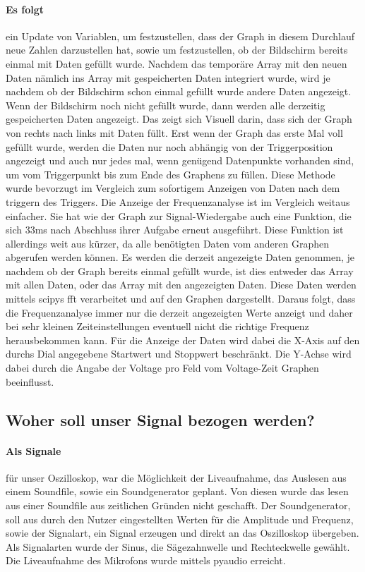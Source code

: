 \documentclass{article}
\begin{document}
\paragraph{Es folgt}
ein Update von Variablen, um festzustellen, dass der Graph in diesem Durchlauf neue Zahlen darzustellen hat, sowie um festzustellen, ob der Bildschirm bereits einmal mit Daten gefüllt wurde. Nachdem das temporäre Array mit den neuen Daten nämlich ins Array mit gespeicherten Daten integriert wurde, wird je nachdem ob der Bildschirm schon einmal gefüllt wurde andere Daten angezeigt. Wenn der Bildschirm noch nicht gefüllt wurde, dann werden alle derzeitig gespeicherten Daten angezeigt. Das zeigt sich Visuell darin, dass sich der Graph von rechts nach links mit Daten füllt. Erst wenn der Graph das erste Mal voll gefüllt wurde, werden die Daten nur noch abhängig von der Triggerposition angezeigt und auch nur jedes mal, wenn genügend Datenpunkte vorhanden sind, um vom Triggerpunkt bis zum Ende des Graphens zu füllen. Diese Methode wurde bevorzugt im Vergleich zum sofortigem Anzeigen von Daten nach dem triggern des Triggers.
Die Anzeige der Frequenzanalyse ist im Vergleich weitaus einfacher. Sie hat wie der Graph zur Signal-Wiedergabe auch eine Funktion, die sich 33ms nach Abschluss ihrer Aufgabe erneut ausgeführt. Diese Funktion ist allerdings weit aus kürzer, da alle benötigten Daten vom anderen Graphen abgerufen werden können. Es werden die derzeit angezeigte Daten genommen, je nachdem ob der Graph bereits einmal gefüllt wurde, ist dies entweder das Array mit allen Daten, oder das Array mit den angezeigten Daten. Diese Daten werden mittels scipys fft verarbeitet und auf den Graphen dargestellt. Daraus folgt, dass die Frequenzanalyse immer nur die derzeit angezeigten Werte anzeigt und daher bei sehr kleinen Zeiteinstellungen eventuell nicht die richtige Frequenz herausbekommen kann. Für die Anzeige der Daten wird dabei die X-Axis auf den durchs Dial angegebene Startwert und Stoppwert beschränkt. Die Y-Achse wird dabei durch die Angabe der Voltage pro Feld vom Voltage-Zeit Graphen beeinflusst.


\subsection{Woher soll unser Signal bezogen werden?}
\paragraph{Als Signale}
für unser Oszilloskop, war die Möglichkeit der Liveaufnahme, das Auslesen aus einem Soundfile, sowie ein Soundgenerator geplant. Von diesen wurde das lesen aus einer Soundfile aus zeitlichen Gründen nicht geschafft.
Der Soundgenerator, soll aus durch den Nutzer eingestellten Werten für die Amplitude und Frequenz, sowie der Signalart, ein Signal erzeugen und direkt an das Oszilloskop übergeben. Als Signalarten wurde der Sinus, die Sägezahnwelle und Rechteckwelle gewählt. 
Die Liveaufnahme des Mikrofons wurde mittels pyaudio erreicht.
\end{document}
